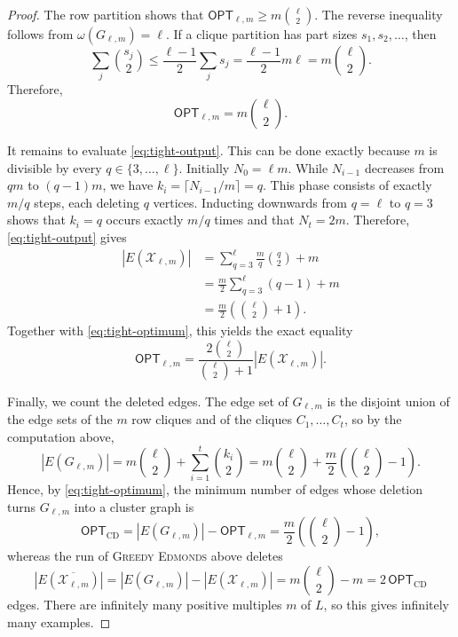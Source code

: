 \documentclass[10pt,a4paper]{amsart}
\newcommand{\edmonds}{{\textsc{Greedy Edmonds}}}
\newcommand{\opt}{{\mathsf{OPT}}}
\begin{document}
\begin{proof}
The row partition shows that
$\opt_{\ell,m}\geq m\binom{\ell}{2}$. The reverse inequality follows
from $\omega(G_{\ell,m})=\ell$. If a clique partition has part sizes
$s_1,s_2,\ldots$, then
\[
   \sum_j\binom{s_j}{2}
   \leq\frac{\ell-1}{2}\sum_j s_j
   =\frac{\ell-1}{2}m\ell
   =m\binom{\ell}{2}.
\]
Therefore,
\begin{equation} \label{eq:tight-optimum}
   \opt_{\ell,m}=m\binom{\ell}{2}.
\end{equation}

It remains to evaluate \eqref{eq:tight-output}. This can be done
exactly because $m$ is divisible by every
$q\in\{3,\ldots,\ell\}$. Initially $N_0=\ell m$. While
$N_{i-1}$ decreases from $qm$ to $(q-1)m$, we have
$k_i=\lceil N_{i-1}/m\rceil=q$. This phase consists of exactly
$m/q$ steps, each deleting $q$ vertices. Inducting downwards from
$q=\ell$ to $q=3$ shows that $k_i=q$ occurs exactly $m/q$ times and
that $N_t=2m$. Therefore, \eqref{eq:tight-output} gives
\begin{align*}
|E(\mathcal{X}_{\ell,m})|
 &=\sum_{q=3}^{\ell}\frac{m}{q}\binom{q}{2}+m\\
 &=\frac{m}{2}\sum_{q=3}^{\ell}(q-1)+m\\
 &=\frac{m}{2}\left(\binom{\ell}{2}+1\right).
\end{align*}
Together with \eqref{eq:tight-optimum}, this yields the exact equality
\[
\opt_{\ell,m}
=\frac{2\binom{\ell}{2}}{\binom{\ell}{2}+1}
 |E(\mathcal{X}_{\ell,m})|.
\]

Finally, we count the deleted edges. The edge set of $G_{\ell,m}$ is the disjoint union of the edge sets of the $m$ row cliques and of the cliques $C_1,\ldots,C_t$, so by the computation above,
\[
   |E(G_{\ell,m})|
   = m\binom{\ell}{2}+\sum_{i=1}^{t}\binom{k_i}{2}
   = m\binom{\ell}{2}+\frac{m}{2}\left(\binom{\ell}{2}-1\right).
\]
Hence, by \eqref{eq:tight-optimum}, the minimum number of edges whose deletion turns $G_{\ell,m}$ into a cluster graph is
\[
   \opt_{\mathrm{CD}}=|E(G_{\ell,m})|-\opt_{\ell,m}
   =\frac{m}{2}\left(\binom{\ell}{2}-1\right),
\]
whereas the run of \edmonds{} above deletes
\[
   |E(\overline{\mathcal{X}_{\ell,m}})|
   =|E(G_{\ell,m})|-|E(\mathcal{X}_{\ell,m})|
   =m\binom{\ell}{2}-m
   =2\,\opt_{\mathrm{CD}}
\]
edges. There are infinitely many positive multiples $m$ of $L$, so this
gives infinitely many examples.
\end{proof}
\end{document}
